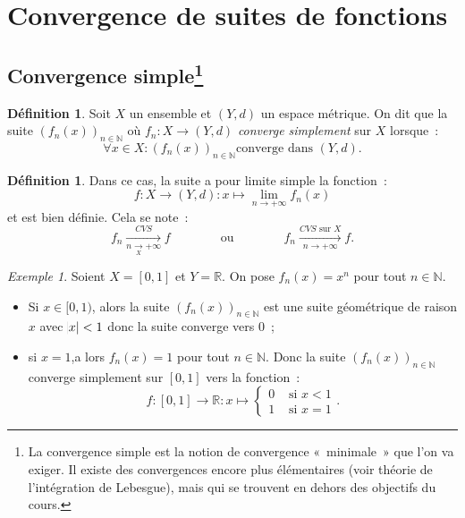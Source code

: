 \documentclass{report}
\theoremstyle{definition}
\newtheorem{déf}[thm]{Définition}
\theoremstyle{remark}
\newtheorem{ex}{Exemple}[chapter]
\numberwithin{equation}{section}
\newcommand{\R}{\mathbb R}
\newcommand{\N}{\mathbb N}
\newcommand{\seqf}[4]{\left(#1_{#2}\left(#3\right)\right)_{#2 \in #4}}
\newcommand{\CONV}[5]{\xrightarrow[#2 \to #3]{#4 \text{ #5 } #1}}
\newcommand{\CVS}[3]{\CONV{#1}{#2}{#3}{CVS}{sur}}
\newcommand{\pinfty}{{+\infty}}
\begin{document}
	\section{Convergence de suites de fonctions}
		\subsection[Convergence simple]{Convergence simple\protect\footnote{La convergence simple est la notion de convergence «~minimale~» que l'on va exiger.
		Il existe des convergences encore plus élémentaires (voir théorie de l'intégration de Lebesgue), mais qui se trouvent en dehors des objectifs du cours.}}
			\begin{déf} Soit $X$ un ensemble et $(Y, d)$ un espace métrique. On dit que la suite $\seqf fnx\N$ où $f_n : X \to (Y, d)$
			\textit{converge simplement} sur $X$ lorsque~:
			\begin{equation}
				\forall x \in X : \seqf fnx\N \text{converge dans } (Y, d).
			\end{equation}
			\end{déf}

			\begin{déf} Dans ce cas, la suite a pour limite simple la fonction~:
			\begin{equation}
				f : X \to (Y, d) : x \mapsto \lim_{n \to \pinfty}f_n(x)
			\end{equation}
			et est bien définie. Cela se note~:
			\begin{equation}
				f_n \xrightarrow[n \underset{X}{\to} \pinfty]{CVS} f \qquad\qquad \text{ou} \qquad\qquad f_n \CVS Xn\pinfty f.
			\end{equation}
			\end{déf}

			\begin{ex} Soient $X = [0, 1]$ et $Y = \R$. On pose $f_n(x) = x^n$ pour tout $n \in \N$.
			\begin{itemize}
				\item Si $x \in [0, 1)$, alors la suite $\seqf fnx\N$ est une suite géométrique de raison $x$ avec $\abs x < 1$ donc la suite converge vers 0~;
				\item si $x = 1$,a lors $f_n(x) = 1$ pour tout $n \in \N$. Donc la suite $\seqf fnx\N$ converge simplement sur $[0, 1]$ vers la fonction~:
					\begin{equation}
						f : [0, 1] \to \R : x \mapsto \begin{cases}0 &\text{ si } x  < 1 \\ 1 &\text{ si } x = 1\end{cases}.
					\end{equation}
			\end{itemize}
			\end{ex}
\end{document}
